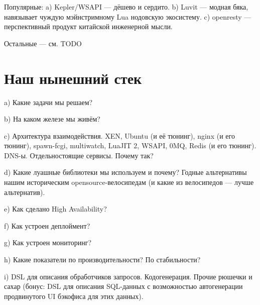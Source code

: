 \documentclass[aspectratio=169,handout]{beamer}
\begin{document}
\begin{frame}
Популярные:
a) Kepler/WSAPI — дёшево и сердито.
b) Luvit — модная бяка, навязывает чуждую мэйнстримному Lua нодовскую экосистему.
c) openresty — перспективный продукт китайской инженерной мысли.

Остальные — см. TODO
\end{frame}


\section{Наш нынешний стек}

\begin{frame}
a) Какие задачи мы решаем?
\end{frame}

\begin{frame}
b) На каком железе мы живём?
\end{frame}

\begin{frame}
c) Архитектура взаимодействия. XEN, Ubuntu (и её тюнинг), nginx (и его тюнинг), spawn-fcgi, multiwatch, LuaJIT 2, WSAPI, 0MQ, Redis (и его тюнинг). DNS-ы. Отдельностоящие сервисы. Почему так?
\end{frame}

\begin{frame}
d) Какие луашные библиотеки мы используем и почему? Годные альтернативы нашим историческим opensource-велосипедам (и какие из велосипедов — лучше альтернатив).
\end{frame}

\begin{frame}
e) Как сделано High Availability?
\end{frame}

\begin{frame}
f) Как устроен деплоймент?
\end{frame}

\begin{frame}
g) Как устроен мониторинг?
\end{frame}

\begin{frame}
h) Какие показатели по производительности? По стабильности?
\end{frame}

\begin{frame}
i) DSL для описания обработчиков запросов. Кодогенерация. Прочие рюшечки и сахар (бонус: DSL для описания SQL-данных с возможностью автогенерации продвинутого UI бэкофиса для этих данных).
\end{frame}
\end{document}
